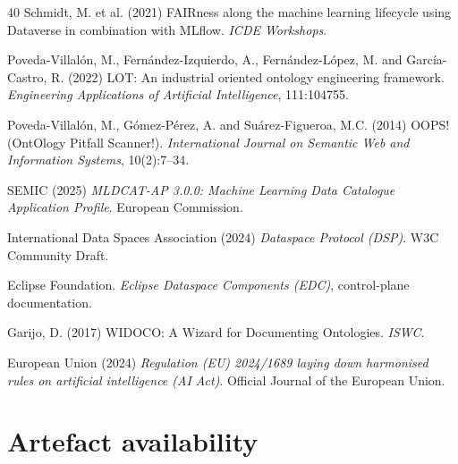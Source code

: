 \documentclass[Afour,sagev,times]{sagej}
\begin{document}
\begin{thebibliography}{40}
 Schmidt, M. et al. (2021) FAIRness along the machine learning lifecycle using Dataverse in combination with MLflow. \emph{ICDE Workshops}.

 Poveda-Villalón, M., Fernández-Izquierdo, A., Fernández-López, M. and García-Castro, R. (2022) LOT: An industrial oriented ontology engineering framework. \emph{Engineering Applications of Artificial Intelligence}, 111:104755.

 Poveda-Villalón, M., Gómez-Pérez, A. and Suárez-Figueroa, M.C. (2014) OOPS! (OntOlogy Pitfall Scanner!). \emph{International Journal on Semantic Web and Information Systems}, 10(2):7--34.

 SEMIC (2025) \emph{MLDCAT-AP 3.0.0: Machine Learning Data Catalogue Application Profile}. European Commission.

 International Data Spaces Association (2024) \emph{Dataspace Protocol (DSP)}. W3C Community Draft.

 Eclipse Foundation. \emph{Eclipse Dataspace Components (EDC)}, control-plane documentation.

 Garijo, D. (2017) WIDOCO: A Wizard for Documenting Ontologies. \emph{ISWC}.

 European Union (2024) \emph{Regulation (EU) 2024/1689 laying down harmonised rules on artificial intelligence (AI Act)}. Official Journal of the European Union.

\end{thebibliography}

\appendix

\section{Artefact availability}\label{app:avail}
\end{document}
